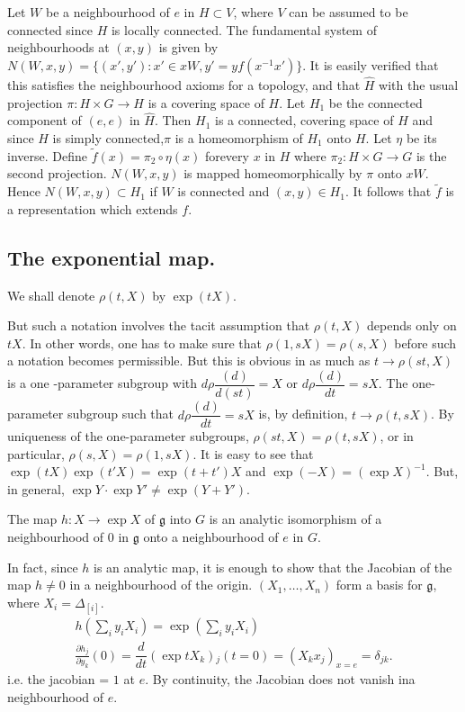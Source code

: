 Let  $W$ be a neighbourhood of $e$ in $H \subset V$, where $V$ can be
assumed to be connected since $H$ is locally connected. The
fundamental system of neighbourhoods at $(x,y)$ is given by $ N(W, x,
y)=\{(x',y'): x' \in x W, y'=y f(x^{-1} x')\}$. It is easily verified
that this satisfies the neighbourhood axioms for a topology, and that
$\hat{H }$ with the usual projection $\pi : H \times G \rightarrow H $ is a
covering space of $H$. Let $H_1$ be the connected component of $(e,e)$
in $\hat{H}$. Then $H_1$ is a connected,  covering space of $H$ and
since $H$ is simply connected,$\pi$ is a homeomorphism of $H_1$ onto
$H$. Let $\eta$ be its inverse. Define $\tilde{f}(x)=\pi_2\circ \eta (x)$
for\pageoriginale every $x$ in $H$ where $\pi_2:H \times G \rightarrow
G$ is the second 
projection. $N(W,x,y)$ is mapped homeomorphically by $\pi$ onto  $x
W$. Hence $N(W,x,y)\subset H_1$ if $W$ is connected and $(x,y)\in
H_1$. It follows that $\tilde{f}$ is a representation which extends
$f$. 

\subsection{The exponential map.}\label{chap3-sec3.4}%

We shall denote $\rho(t,X)$ by $\exp (t X)$.


But such a notation involves the tacit assumption that $\rho(t,X )$
depends only  on $t X$. In other words, one has to make sure that
$\rho (1, s X)= \rho (s, X)$ before such a notation becomes
permissible. But this is obvious in as much as $t \rightarrow \rho(st,
X)$ is a one -parameter subgroup with $d \rho \dfrac{(d)}{d(st)}=X$ or
$d \rho \dfrac{(d)}{dt}=sX$. The one-parameter subgroup such that $d
\rho \dfrac{(d)}{dt}=sX$ is, by definition, $t \rightarrow  \rho(t, s
X)$. By uniqueness of the one-parameter subgroups, $\rho (st, X)=
\rho(t, sX)$, or in particular, $\rho (s, X )= \rho  (1,s X)$. It is
easy to see that $\exp(tX)\exp(t'X)=\exp(t+t')X$  and $\exp (-X)=(\exp
X)^{-1}$. But, in general, $\exp Y\cdot \exp Y' \neq  \exp (Y+Y')$. 
 
\begin{thm}\label{chap3-thm2}%
The map $h: X \rightarrow \exp X$ {of} $\mathfrak{g}$ {into} $G$
is an analytic isomorphism of a neighbourhood of $0$ {in}
$\mathfrak{g}$ {onto a neighbourhood of} $e$ {in} $G$. 
\end{thm}
 
In fact, since $h$ is an analytic map, it is enough to show that the
Jacobian of the map $h \neq 0$ in a neighbourhood of the origin. 
$(X_1,\ldots,X_n) $ form a basis for $\mathfrak{g}$, where
$X_i=\Delta_{[i]}$. 
\begin{gather*}
h \left(\sum_{i} y_i X_i \right)=\exp (\sum_i y_i X_i)\\
\frac{\partial h_j}{\partial y_k}(0)=\dfrac{d}{dt}(\exp tX_k)
 {}_j(t=0) = (X_k x_j)_{x=e}=\delta_{jk}. 
\end{gather*}
i.e. the jacobian = $1$ at $e$. By continuity, the Jacobian does not
vanish in\pageoriginale a neighbourhood of $e$. 
 
